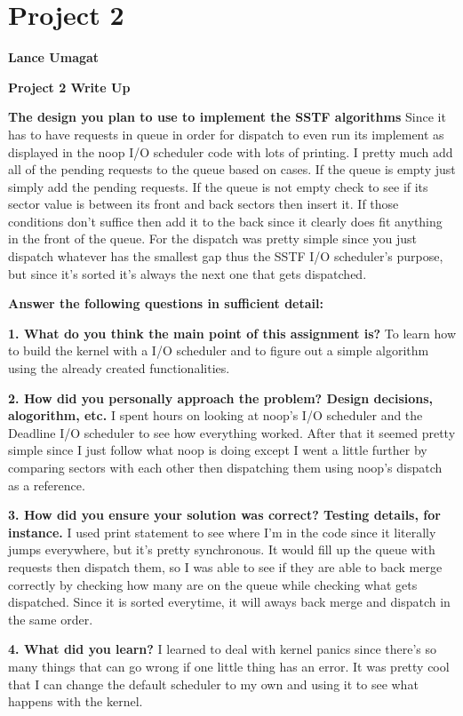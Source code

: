 \documentclass[draftclsnofoot,onecolumn,letterpaper,10pt,titlepage]{IEEEtran}
\begin{document}
\section*{Project 2}

\textbf{Lance Umagat}

\textbf{Project 2 Write Up}

\textbf{The design you plan to use to implement the SSTF algorithms}
	Since it has to have requests in queue in order for dispatch to even run its implement as displayed in the noop I/O scheduler code with lots of printing. I pretty much add all of the pending requests to the queue based on cases. If the queue is empty just simply add the pending requests. If the queue is not empty check to see if its sector value is between its front and back sectors then insert it. If those conditions don't suffice then add it to the back since it clearly does fit anything in the front of the queue. For the dispatch was pretty simple since you just dispatch whatever has the smallest gap thus the SSTF I/O scheduler's purpose, but since it's sorted it's always the next one that gets dispatched.

\textbf{Answer the following questions in sufficient detail:}

    \textbf{1. What do you think the main point of this assignment is?}
    To learn how to build the kernel with a I/O scheduler and to figure out a simple algorithm using the already created functionalities.

    \textbf{2. How did you personally approach the problem? Design decisions, alogorithm, etc.}
    I spent hours on looking at noop's I/O scheduler and the Deadline I/O scheduler to see how everything worked. After that it seemed pretty simple since I just follow what noop is doing except I went a little further by comparing sectors with each other then dispatching them using noop's dispatch as a reference.

    \textbf{3. How did you ensure your solution was correct? Testing details, for instance.}
    I used print statement to see where I'm in the code since it literally jumps everywhere, but it's pretty synchronous. It would fill up the queue with requests then dispatch them, so I was able to see if they are able to back merge correctly by checking how many are on the queue while checking what gets dispatched. Since it is sorted everytime, it will aways back merge and dispatch in the same order.

    \textbf{4. What did you learn?}
    I learned to deal with kernel panics since there's so many things that can go wrong if one little thing has an error. It was pretty cool that I can change the default scheduler to my own and using it to see what happens with the kernel.
\end{document}
